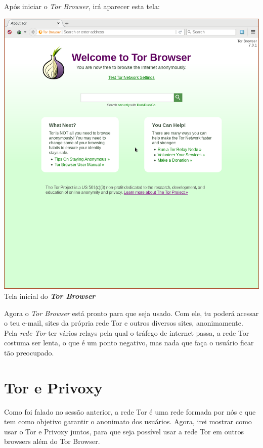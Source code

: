 \documentclass[12pt, letterpaper, Monospace:12]{report}
\begin{document}
\pagebreak

	Após iniciar o \textit{Tor Browser}, irá aparecer esta tela:

	\begin{center}
		\includegraphics[scale=0.55]{tbb3.png}\\
		\footnotesize{Tela inicial do \textbf{\textit{Tor Browser}}}
	\end{center}

	Agora o \textit{Tor Browser} está pronto para que seja usado. Com ele, tu poderá acessar o teu e-mail, sites da própria rede Tor e outros diversos sites, anonimamente.\\

	Pela \textit{rede Tor} ter vários relays pela qual o tráfego de internet passa, a rede Tor costuma ser lenta, o que é um ponto negativo, mas nada que faça o usuário ficar tão preocupado.

\pagebreak

\section{Tor e Privoxy}
	Como foi falado no sessão anterior, a rede Tor é uma rede formada por nós e que tem como objetivo garantir o anonimato dos usuários. Agora, irei mostrar como usar o Tor e Privoxy juntos, para que seja possível usar a rede Tor em outros browsers além do Tor Browser.
\end{document}
